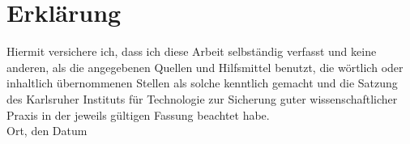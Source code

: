 \documentclass[12pt,a4paper]{scrartcl}
\theoremstyle{plain}
\theoremstyle{definition}
\newcommand{\2}{\mathbb{Z} / 2 \mathbb{Z}}
\newcommand{\1}{\bar{1}}
\newcommand{\0}{\bar{0}}
\begin{document}
      

\newpage
  
 \thispagestyle{empty}


\vspace*{8cm}


\section*{Erklärung}

Hiermit versichere ich, dass ich diese Arbeit selbständig verfasst und keine anderen, als die angegebenen Quellen und Hilfsmittel benutzt, die wörtlich oder inhaltlich übernommenen Stellen als solche kenntlich gemacht und die Satzung des Karlsruher Instituts für Technologie zur Sicherung guter wissenschaftlicher Praxis in der jeweils gültigen Fassung beachtet habe. \\[2ex] 

\noindent
Ort, den Datum\\[5ex]

\end{document}
